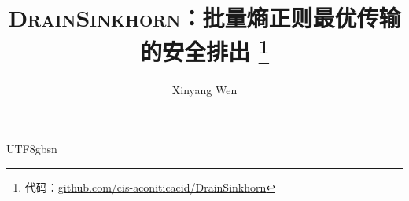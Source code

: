 \documentclass[10pt,twocolumn]{article}
\title{\textsc{DrainSinkhorn}：批量熵正则最优传输的安全排出%
\thanks{代码：\href{https://github.com/cis-aconiticacid/DrainSinkhorn}{github.com/cis-aconiticacid/DrainSinkhorn}}}
\author{Xinyang Wen}
\date{}
\begin{document}
\raggedbottom
\begin{CJK*}{UTF8}{gbsn}
\renewcommand{\abstractname}{摘要}
\renewcommand{\figurename}{图}
\renewcommand{\tablename}{表}
\renewcommand{\refname}{参考文献}
\maketitle
\begin{abstract}

\end{abstract}









\begingroup
\small


\endgroup

\appendix

\end{CJK*}
\end{document}
